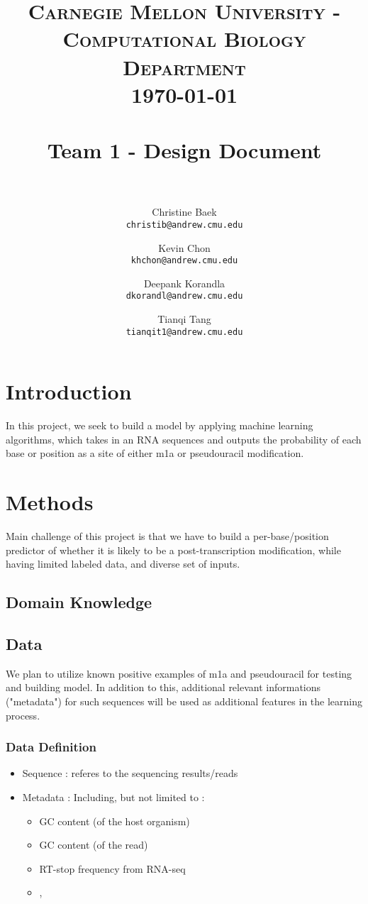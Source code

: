 \documentclass[paper=a4, fontsize=11pt]{scrartcl}
\title{
    \usefont{OT1}{bch}{b}{n}
    \normalfont \normalsize \textsc{Carnegie Mellon University - Computational Biology Department} \\ [25pt]
    \today \\
    \horrule{0.5pt} \\[0.4cm]
    \huge Team 1 - Design Document\\
    \horrule{2pt} \\[0.5cm]
}
\author{
  Christine Baek\\
  \normalsize\texttt{christib@andrew.cmu.edu}
  \and
  Kevin Chon\\
  \normalsize\texttt{khchon@andrew.cmu.edu}
  \and
  Deepank Korandla\\
  \normalsize\texttt{dkorandl@andrew.cmu.edu}
   \and
  Tianqi Tang\\
  \normalsize\texttt{tianqit1@andrew.cmu.edu}
  \date{}
}
\date{}
\numberwithin{equation}{section}    %
\numberwithin{figure}{section}      %
\numberwithin{table}{section}       %
\numberwithin{equation}{section}    %
\numberwithin{figure}{section}      %
\numberwithin{table}{section}       %
\begin{document}
\maketitle
\section{Introduction}
In this project, we seek to build a model by applying machine learning algorithms, which takes in an RNA sequences and outputs the probability of each base or position as a site of either m1a or pseudouracil modification. 



\section{Methods}

Main challenge of this project is that we have to build a per-base/position predictor of whether it is likely to be a post-transcription modification, while having limited labeled data, and diverse set of inputs. 

\subsection{Domain Knowledge}


\subsection{Data}

We plan to utilize known positive examples of m1a and pseudouracil for testing and building model. In addition to this, additional relevant informations ("metadata") for such sequences will be used as additional features in the learning process. 

\subsubsection{Data Definition}
\begin{itemize}
	\item Sequence : referes to the sequencing results/reads
	\item Metadata : Including, but not limited to :
	\begin{itemize}
		\item GC content (of the host organism)
		\item GC content (of the read)
		\item RT-stop frequency from RNA-seq
		\item ,
	\end{itemize}
\end{itemize}
\end{document}
